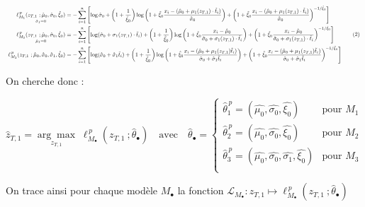 \documentclass[
  article,
  nofooter,
  noheadings]{jss}
\begin{document}
\[
\scalebox{0.7}{
\(
\begin{aligned}
\underset{\hat{\sigma}_1 = 0}{\ell_{M_1}^{\,p}(z_{T,1} \ ; \hat{\mu}_0, \hat{\sigma}_0, \hat{\xi}_0)} &= 
-\sum_{i=1}^n \left[
\log \hat{\sigma}_0 +
\left(1 + \frac{1}{\hat{\xi}_0} \right) \log \left(1 + \hat{\xi}_0 \frac{x_i - (\hat{\mu}_0 + \mu_1(z_{T,1}) \cdot \tilde{t}_i)}{\hat{\sigma}_0} \right) +
\left(1 + \hat{\xi}_0 \frac{x_i - (\hat{\mu}_0 + \mu_1(z_{T,1}) \cdot \tilde{t}_i)}{\hat{\sigma}_0} \right)^{-1/\hat{\xi}_0}
\right]\\
\underset{\hat{\mu}_1 = 0}{\ell_{M_2}^{\,p}(z_{T,1} \ ; \hat{\mu}_0, \hat{\sigma}_0, \hat{\xi}_0)} &= 
-\sum_{i=1}^n \left[
\log (\hat{\sigma}_0 + \sigma_1(z_{T,1}) \cdot \tilde{t}_i) +
\left(1 + \frac{1}{\hat{\xi}_0} \right) \log \left(1 + \hat{\xi}_0 \frac{x_i - \hat{\mu}_0}{\hat{\sigma}_0 + \sigma_1(z_{T,1}) \cdot \tilde{t}_i} \right) +
\left(1 + \hat{\xi}_0 \frac{x_i - \hat{\mu}_0}{\hat{\sigma}_0 + \sigma_1(z_{T,1}) \cdot \tilde{t}_i} \right)^{-1/\hat{\xi}_0}
\right]\\
\ell_{M_3}^{\,p}(z_{T,1} \ ; \hat{\mu}_0, \hat{\sigma}_0, \hat{\sigma}_1, \hat{\xi}_0) &= 
-\sum_{i=1}^n \left[
\log (\hat{\sigma}_0 + \hat{\sigma}_1 \tilde{t}_i) +
\left(1 + \frac{1}{\hat{\xi}_0} \right) \log \left(1 + \hat{\xi}_0 \frac{x_i - (\hat{\mu}_0 + \mu_1(z_{T,1}) \tilde{t}_i)}{\hat{\sigma}_0 + \hat{\sigma}_1 \tilde{t}_i} \right) +
\left(1 + \hat{\xi}_0 \frac{x_i - (\hat{\mu}_0 + \mu_1(z_{T,1}) \tilde{t}_i)}{\hat{\sigma}_0 + \hat{\sigma}_1 \tilde{t}_i} \right)^{-1/\hat{\xi}_0}
\right]\\
\end{aligned}
\tag{2}
\)
}
\]

On cherche donc :

\[
\hat{z}_{T,1} = \underset{z_{T,1}}{\arg\max} \; \ell_{M_\bullet}^{\,p}(z_{T,1} \ ; \hat{\theta}_{\bullet}) \quad \text{avec} \quad
\hat{\theta}_{\bullet} = \begin{cases}
\hat{\theta}_{1}^{\,p} = (\hat{\mu_0}, \hat{\sigma_0}, \hat{\xi_0}) & \text{pour } M_1 \\
\hat{\theta}_2^{\,p} = (\hat{\mu_0}, \hat{\sigma_0}, \hat{\xi_0}) & \text{pour } M_2 \\
\hat{\theta}_3^{\,p} = (\hat{\mu_0}, \hat{\sigma_0}, \hat{\sigma_1}, \hat{\xi_0}) & \text{pour } M_3 \\
\end{cases}
\]

On trace ainsi pour chaque modèle \(M_\bullet\) la fonction
\({\displaystyle \mathcal{L}_{M_\bullet} : z_{T,1} {\mapsto} \ell_{M_\bullet}^{\,p}(z_{T,1} \ ; \hat{\theta}_{\bullet})}\)
\end{document}
